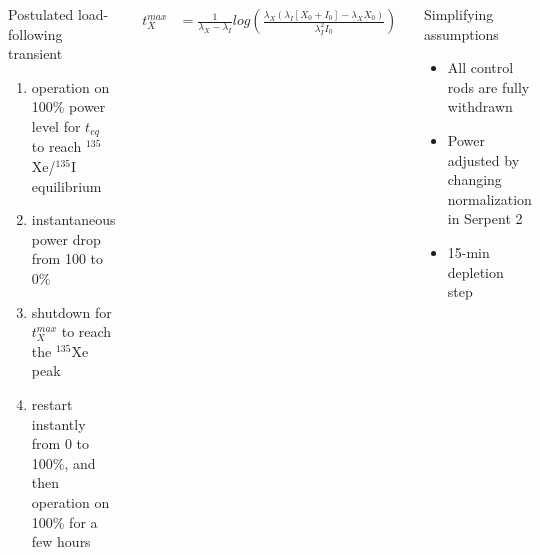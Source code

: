 \begin{frame}
\begin{columns}
	\column[t]{6.3cm}
	\begin{block}{Postulated load-following transient}
		\begin{enumerate}             
			\item operation on 100\% power	level for \textbf{$t_{eq}$} to 
			reach $^{135}$Xe/$^{135}$I equilibrium
			\item instantaneous power drop from 100 to 0\%
			\item shutdown for \textbf{$t^{max}_{X}$} to reach the 
			$^{135}$Xe peak
			\item restart instantly from 0 to 100\%, and then operation on 
			100\% for a few hours
		\end{enumerate}
			\vspace{-8mm}
	\end{block}
		\begin{align}\label{eq:time-xe-max}
		t^{max}_{X} &= \frac{1}{\lambda_X-\lambda_I}
		log\left(\frac{\lambda_X(\lambda_I[X_0+I_0]-\lambda_XX_0)}{\lambda_I^2 
		I_0}\right) \nonumber
		\end{align}
	\begin{block}{Simplifying assumptions}
		\begin{itemize}
			\item All control rods are fully withdrawn
			\item Power adjusted by changing normalization in Serpent 2
			\item 15-min depletion step
		\end{itemize}
		
	\end{block}
\end{columns}
\end{frame}

